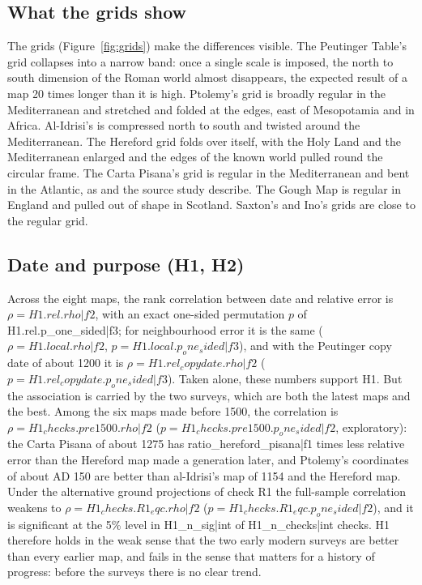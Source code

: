 \documentclass[11pt,a4paper]{article}
\begin{document}
\subsection{What the grids show}
The grids (Figure~\ref{fig:grids}) make the differences visible. The Peutinger Table's grid collapses into a narrow band: once a single scale is imposed, the north to south dimension of the Roman world almost disappears, the expected result of a map 20 times longer than it is high. Ptolemy's grid is broadly regular in the Mediterranean and stretched and folded at the edges, east of Mesopotamia and in Africa. Al-Idrisi's is compressed north to south and twisted around the Mediterranean. The Hereford grid folds over itself, with the Holy Land and the Mediterranean enlarged and the edges of the known world pulled round the circular frame. The Carta Pisana's grid is regular in the Mediterranean and bent in the Atlantic, as \citet{campbell1987} and the source study describe. The Gough Map is regular in England and pulled out of shape in Scotland. Saxton's and Ino's grids are close to the regular grid.

\subsection{Date and purpose (H1, H2)}
Across the eight maps, the rank correlation between date and relative error is $\rho = {{H1.rel.rho|f2}}$, with an exact one-sided permutation $p$ of {{H1.rel.p_one_sided|f3}}; for neighbourhood error it is the same ($\rho = {{H1.local.rho|f2}}$, $p = {{H1.local.p_one_sided|f3}}$), and with the Peutinger copy date of about 1200 it is $\rho = {{H1.rel_copydate.rho|f2}}$ ($p = {{H1.rel_copydate.p_one_sided|f3}}$). Taken alone, these numbers support H1. But the association is carried by the two surveys, which are both the latest maps and the best. Among the six maps made before 1500, the correlation is $\rho = {{H1_checks.pre1500.rho|f2}}$ ($p = {{H1_checks.pre1500.p_one_sided|f2}}$, exploratory): the Carta Pisana of about 1275 has {{ratio_hereford_pisana|f1}} times less relative error than the Hereford map made a generation later, and Ptolemy's coordinates of about AD 150 are better than al-Idrisi's map of 1154 and the Hereford map. Under the alternative ground projections of check R1 the full-sample correlation weakens to $\rho = {{H1_checks.R1_eqc.rho|f2}}$ ($p = {{H1_checks.R1_eqc.p_one_sided|f2}}$), and it is significant at the 5\% level in {{H1_n_sig|int}} of {{H1_n_checks|int}} checks. H1 therefore holds in the weak sense that the two early modern surveys are better than every earlier map, and fails in the sense that matters for a history of progress: before the surveys there is no clear trend.
\end{document}
